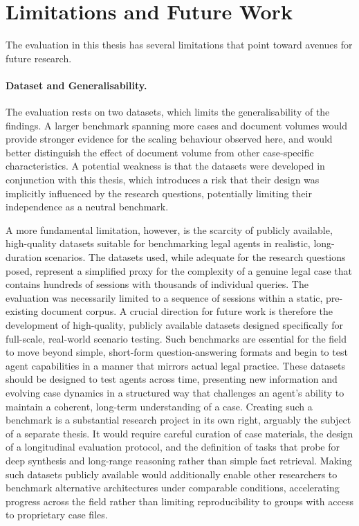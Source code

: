 \section{Limitations and Future Work}
\label{sec:future-work}

The evaluation in this thesis has several limitations that point toward avenues for future research.

\paragraph{Dataset and Generalisability.}
The evaluation rests on two datasets, which limits the generalisability of the findings. A larger benchmark spanning more cases and document volumes would provide stronger evidence for the scaling behaviour observed here, and would better distinguish the effect of document volume from other case-specific characteristics. A potential weakness is that the datasets were developed in conjunction with this thesis, which introduces a risk that their design was implicitly influenced by the research questions, potentially limiting their independence as a neutral benchmark.

A more fundamental limitation, however, is the scarcity of publicly available, high-quality datasets suitable for benchmarking legal agents in realistic, long-duration scenarios. The datasets used, while adequate for the research questions posed, represent a simplified proxy for the complexity of a genuine legal case that contains hundreds of sessions with thousands of individual queries. The evaluation was necessarily limited to a sequence of sessions within a static, pre-existing document corpus. A crucial direction for future work is therefore the development of high-quality, publicly available datasets designed specifically for full-scale, real-world scenario testing. Such benchmarks are essential for the field to move beyond simple, short-form question-answering formats and begin to test agent capabilities in a manner that mirrors actual legal practice. These datasets should be designed to test agents across time, presenting new information and evolving case dynamics in a structured way that challenges an agent's ability to maintain a coherent, long-term understanding of a case. Creating such a benchmark is a substantial research project in its own right, arguably the subject of a separate thesis. It would require careful curation of case materials, the design of a longitudinal evaluation protocol, and the definition of tasks that probe for deep synthesis and long-range reasoning rather than simple fact retrieval. Making such datasets publicly available would additionally enable other researchers to benchmark alternative architectures under comparable conditions, accelerating progress across the field rather than limiting reproducibility to groups with access to proprietary case files.

